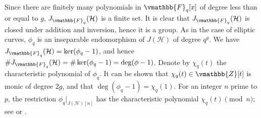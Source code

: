 Since there are finitely many polynomials in $\vmathbb{F}_q[x]$ of degree less than or equal to $g$, 
$J_{\vmathbb{F}_q}(\mathcal{H})$ is a finite set. It is clear that $J_{\vmathbb{F}_q}(\mathcal{H})$ is 
closed under addition and inversion, hence it is a group. As in the case of elliptic curves, 
$\phi_q$ is an inseparable endomorphism of $J(\mathcal{H})$ of degree $q^g$. We have 
$J_{\vmathbb{F}_q}(\mathcal{H}) = \ker(\phi_q - 1)$, and hence $\#J_{\vmathbb{F}_q}(\mathcal{H}) = 
\#\ker(\phi_q - 1) = \deg(\phi - 1)$. Denote by $\chi_q(t)$ the characteristic polynomial of 
$\phi_q$. It can be shown that $\chi_q(t) \in \vmathbb{Z}[t]$ is monic of degree $2g$, and that 
$\deg(\phi_q - 1) = \chi_q(1)$. For an integer $n$ prime to $p$, the restriction 
$\phi_q\vert_{J(\mathcal{H})[n]}$ has the characteristic polynomial $\chi_q(t) \pmod n$; see 
\cite[ch. 4, 5]{Cohen2006} or \cite{Mumford1974}.

